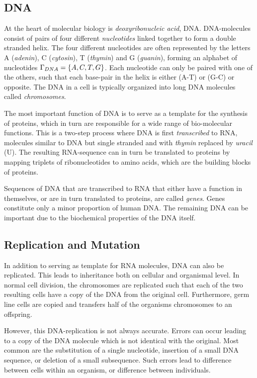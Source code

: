 \subsection{DNA}
At the heart of molecular biology is \emph{deoxyribonucleic acid}, DNA.
DNA-molecules consist of pairs of four different \emph{nucleotides} linked together to form a double stranded helix.
The four different nucleotides are often represented by the letters A (\emph{adenin}), C (\emph{cytosin}), T (\emph{thymin}) and G (\emph{guanin}), forming an alphabet of nucleotides $\Gamma_{DNA} = \left\{A, C, T, G\right\}$.
Each nucleotide can only be paired with one of the others, such that each base-pair in the helix is either (A-T) or (G-C) or opposite. The DNA in a cell is typically organized into long DNA molecules called \emph{chromosomes}. 

The most important function of DNA is to serve as a template for the synthesis of proteins, which in turn are responsible for a wide range of bio-molecular functions.
This is a two-step process where DNA is first \emph{transcribed} to RNA, molecules similar to DNA but single stranded and with \emph{thymin} replaced by \emph{uracil} (U).
The resulting RNA-sequence can in turn be translated to proteins by mapping triplets of ribonucleotides to amino acids, which are the building blocks of proteins.

Sequences of DNA that are transcribed to RNA that either have a function in themselves, or are in turn translated to proteins, are called \emph{genes}.
Genes constitute only a minor proportion of human DNA.
The remaining DNA can be important due to the biochemical properties of the DNA itself. 


\subsection{Replication and Mutation}
In addition to serving as template for RNA molecules, DNA can also be replicated.
This leads to inheritance both on cellular and organismal level.
In normal cell division, the chromosomes are replicated such that each of the two resulting cells have a copy of the DNA from the original cell.
Furthermore, germ line cells are copied and transfers half of the organisms chromosomes to an offspring.

However, this DNA-replication is not always accurate.
Errors can occur leading to a copy of the DNA molecule which is not identical with the original.
Most common are the substitution of a single nucleotide, insertion of a small DNA sequence, or deletion of a small subsequence.
Such errors lead to difference between cells within an organism, or difference between individuals.

